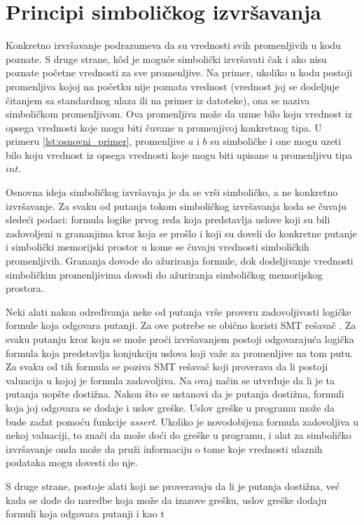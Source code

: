 \documentclass[12pt,oneside]{memoir}
\begin{document}
\section{Principi simboličkog izvršavanja}

Konkretno izvršavanje podrazumeva da su vrednosti svih promenljivih u kodu poznate. S druge strane, k\^od je moguće simbolički izvršavati čak i ako nisu poznate početne vrednosti za sve promenljive. Na primer, ukoliko u kodu postoji promenljiva kojoj na početku nije poznata vrednost (vrednost joj se dodeljuje čitanjem sa standardnog ulaza ili na primer iz datoteke), ona se naziva simboličkom  promenljivom. Ova promenljiva može da uzme bilo koju vrednost iz opsega vrednosti koje mogu biti čuvane u promenjivoj konkretnog tipa. U primeru \ref{lst:osnovni_primer}, promenljive $a$ i $b$ su simboličke i one mogu uzeti bilo koju vrednost iz opsega vrednosti koje mogu biti upisane u promenljivu tipa $int$.

\indent Osnovna ideja simboličkog izvršavnja je da se vrši simboličko, a ne konkretno izvršavanje. Za svaku od putanja tokom simboličkog izvršavanja koda se čuvaju sledeći podaci: formula logike prvog reda koja predstavlja uslove koji su bili zadovoljeni u grananjima kroz koja se prošlo i koji su doveli do konkretne putanje i simbolički memorijski prostor u kome se čuvaju vrednosti simboličkih promenljivih. Grananja dovode do ažuriranja formule, dok dodeljivanje vrednosti simboličkim promenljivima dovodi do ažuriranja simboličkog memorijskog prostora. 

\indent Neki alati nakon određivanja neke od putanja vrše proveru zadovoljivosti logičke formule koja odgovara putanji. Za ove potrebe se obično koristi SMT rešavač \cite{SMT}. Za svaku putanju kroz koju se može proći izvršavanjem postoji odgovarajuća logička formula koja predstavlja konjukciju uslova koji važe za promenljive na tom putu. Za svaku od tih formula se poziva SMT rešavač koji proverava da li postoji valuacija u kojoj je formula zadovoljiva. Na ovaj način se utvrđuje da li je ta putanja uopšte dostižna.
Nakon što se ustanovi da je putanja dostižna, formuli koja joj odgovara se dodaje i uslov greške. Uslov greške u programu može da bude zadat pomoću funkcije \textit{assert}. Ukoliko je novodobijena formula zadovoljiva u nekoj valuaciji, to znači da može doći do greške u programu, i alat za simboličko izvršavanje onda može da pruži informaciju o tome koje vrednosti ulaznih podataka mogu dovesti do nje.

S druge strane, postoje alati koji ne proveravaju da li je putanja dostižna, već kada se dođe do naredbe koja može da izazove grešku, uslov greške dodaju formuli koja odgovara putanji i kao t
\end{document}
